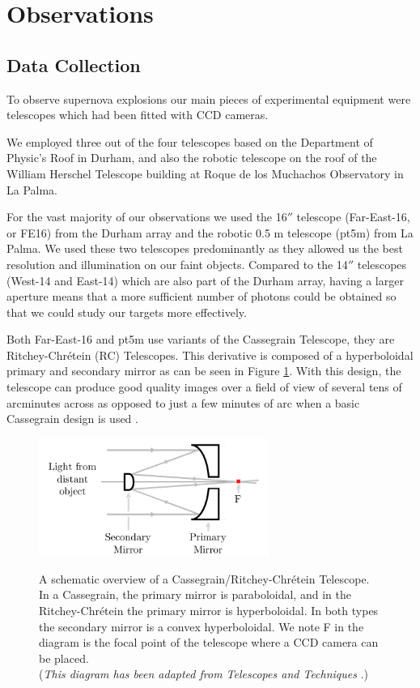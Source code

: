 \documentclass[twocolumn]{revtex4}
\begin{document}
\vspace{-3ex}
\section{Observations} 
\label{obsver}
\vspace{-2ex}
\subsection{Data Collection}
\label{observer-collection}
\vspace{-2ex}
To observe supernova explosions our main pieces of experimental equipment were telescopes which had been fitted with CCD cameras.

We employed three out of the four telescopes based on the Department of Physic's Roof in Durham, and also the robotic telescope on the roof of the William Herschel Telescope building at Roque de los Muchachos Observatory in La Palma.

For the vast majority of our observations we used the 16$''$ telescope (Far-East-16, or FE16) from the Durham array and the robotic 0.5 m telescope (pt5m) from La Palma. We used these two telescopes predominantly as they allowed us the best resolution and illumination on our faint objects. Compared to the 14$''$ telescopes (West-14 and East-14) which are also part of the Durham array, having a larger aperture means that a more sufficient number of photons could be obtained so that we could study our targets more effectively. 

Both Far-East-16 and pt5m use variants of the Cassegrain Telescope, they are Ritchey-Chr\'{e}tein (RC) Telescopes. This derivative is composed of a hyperboloidal primary and secondary mirror \cite{tel_tech} as can be seen in Figure \ref{fig:cass_spec}. With this design, the telescope can produce good quality images over a field of view of several tens of arcminutes across as opposed to just a few minutes of arc when a basic Cassegrain design is used \cite{tel_tech}. 
\begin{figure}[!h]
\begin{center}
\includegraphics[width=7.5cm]{observations/cassegrain}
\caption[]{A schematic overview of a Cassegrain/Ritchey-Chr\'{e}tein Telescope. In a Cassegrain, the primary mirror is paraboloidal, and in the Ritchey-Chr\'{e}tein the primary mirror is hyperboloidal. In both types the secondary mirror is a convex hyperboloidal. We note F in the diagram is the focal point of the telescope where a CCD camera can be placed. \\ (\textit{This diagram has been adapted from Telescopes and Techniques} \cite{tel_tech}.)}
\vspace{-1.5em}
\label{fig:cass_spec}
\end{center}
\end{figure}
\end{document}
